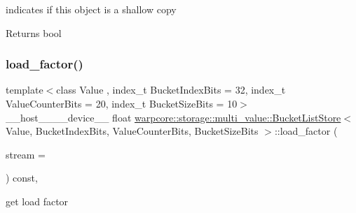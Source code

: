 indicates if this object is a shallow copy 

\begin{DoxyReturn}{Returns}
{\ttfamily bool} 
\end{DoxyReturn}
\mbox{\label{classwarpcore_1_1storage_1_1multi__value_1_1BucketListStore_a195a0df8c935bf26300d2939cbd04b0f}} 
\subsubsection{\texorpdfstring{load\+\_\+factor()}{load\_factor()}}
{\footnotesize\ttfamily template$<$class Value , index\+\_\+t Bucket\+Index\+Bits = 32, index\+\_\+t Value\+Counter\+Bits = 20, index\+\_\+t Bucket\+Size\+Bits = 10$>$ \\
\+\_\+\+\_\+host\+\_\+\+\_\+\+\_\+\+\_\+device\+\_\+\+\_\+ float \hyperlink{classwarpcore_1_1storage_1_1multi__value_1_1BucketListStore}{warpcore\+::storage\+::multi\+\_\+value\+::\+Bucket\+List\+Store}$<$ Value, Bucket\+Index\+Bits, Value\+Counter\+Bits, Bucket\+Size\+Bits $>$\+::load\+\_\+factor (\begin{DoxyParamCaption}\item[{const cuda\+Stream\+\_\+t}]{stream = {} }\end{DoxyParamCaption}) const\hspace{0.3cm}{\ttfamily [inline]}, {\ttfamily [noexcept]}}



get load factor 


